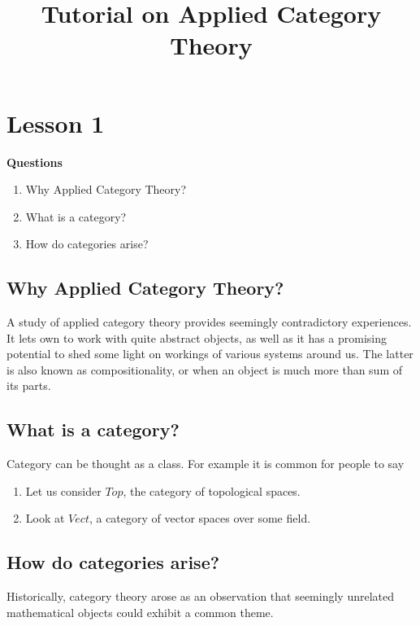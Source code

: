 \documentclass{report}
\title{Tutorial on Applied Category Theory}
\begin{document}
\maketitle
\chapter{Lesson 1}
\textbf{Questions}\\
\begin{enumerate}
	\item Why Applied Category Theory?
	\item What is a category?
	\item How do categories arise?
\end{enumerate}
\section*{Why Applied Category Theory?}
A study of applied category theory provides seemingly contradictory experiences. It lets own to work with quite abstract objects, as well as it has a promising potential to shed some light on workings of various systems around us. The latter is also known as compositionality, or when an object is much more than sum of its parts.

\section*{What is a category?}
Category can be thought as a class. For example it is common for people to say
\begin{enumerate}
	\item Let us consider $Top$, the category of topological spaces.
	\item Look at $Vect$, a category of vector spaces over some field.
\end{enumerate}

\section*{How do categories arise?}
Historically, category theory arose as an observation that seemingly unrelated mathematical objects could exhibit a common theme.
\end{document}
